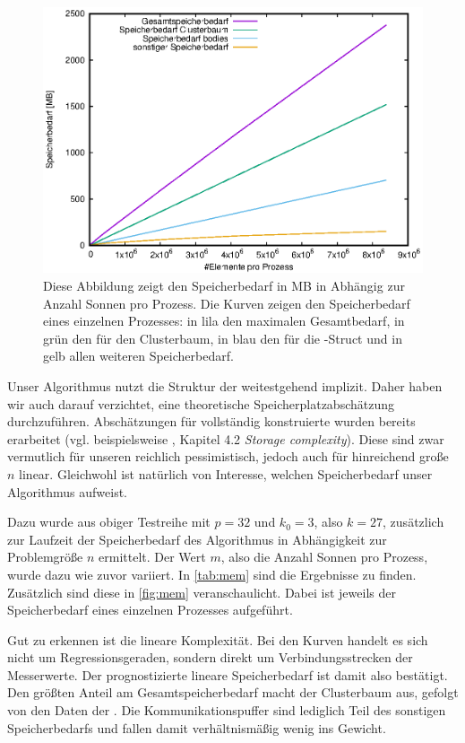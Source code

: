   
  \begin{figure}[b]
    \includegraphics{img/grav_32X_mem.eps}
    \caption{Diese Abbildung zeigt den Speicherbedarf in MB in Abhängig zur Anzahl Sonnen pro Prozess. Die Kurven zeigen den Speicherbedarf eines einzelnen Prozesses: in lila den maximalen 
    Gesamtbedarf, in grün den für den Clusterbaum, in blau den für die -Struct und in gelb allen weiteren Speicherbedarf.}
    \label{fig:mem}
  \end{figure}

  Unser Algorithmus nutzt die Struktur der \hquad weitestgehend implizit. Daher haben wir auch darauf verzichtet, eine theoretische Speicherplatzabschätzung durchzuführen. Abschätzungen für vollständig
  konstruierte \hquad wurden bereits erarbeitet (vgl. beispielsweise \citet{distrh2}, Kapitel 4.2 \textit{Storage complexity}). Diese sind zwar vermutlich für unseren reichlich pessimistisch, jedoch
  auch für hinreichend große $n$ linear. Gleichwohl ist natürlich von Interesse, welchen Speicherbedarf unser Algorithmus aufweist.
  
  Dazu wurde aus obiger Testreihe mit $p=32$ und $k_0=3$, also $k = 27$, zusätzlich zur Laufzeit der Speicherbedarf des Algorithmus in Abhängigkeit zur Problemgröße $n$ ermittelt. Der Wert $m$, also
  die Anzahl Sonnen pro Prozess, wurde dazu wie zuvor variiert. In \autoref{tab:mem} sind die Ergebnisse zu finden. Zusätzlich sind diese in \autoref{fig:mem} veranschaulicht. Dabei ist jeweils
  der Speicherbedarf eines einzelnen Prozesses aufgeführt. 
  
  Gut zu erkennen ist die lineare Komplexität. Bei den Kurven handelt es sich nicht um Regressionsgeraden, sondern direkt um Verbindungsstrecken der Messerwerte. Der prognostizierte lineare 
  Speicherbedarf ist damit also bestätigt. Den größten Anteil am Gesamtspeicherbedarf macht der Clusterbaum aus, gefolgt von den Daten der . Die Kommunikationspuffer sind lediglich
  Teil des sonstigen Speicherbedarfs und fallen damit verhältnismäßig wenig ins Gewicht. 
  
